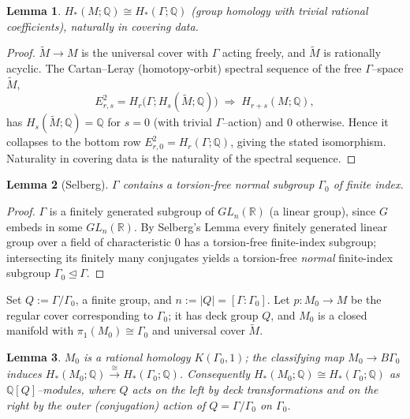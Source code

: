 \documentclass[12pt]{article}
\newcommand{\bR}{\mathbb{R}}
\newcommand{\bQ}{\mathbb{Q}}
\newtheorem{lemma}{Lemma}
\theoremstyle{definition}
\begin{document}
\begin{lemma}\label{lem:rationalKpi1}
$H_*(M;\bQ)\cong H_*(\Gamma;\bQ)$ \textup{(}group homology with trivial rational
coefficients\textup{)}, naturally in covering data.
\end{lemma}

\begin{proof}
$\widetilde M\to M$ is the universal cover with $\Gamma$ acting freely, and
$\widetilde M$ is rationally acyclic.  The Cartan--Leray (homotopy-orbit)
spectral sequence of the free $\Gamma$--space $\widetilde M$,
\[
   E^2_{r,s}=H_r\!\bigl(\Gamma;H_s(\widetilde M;\bQ)\bigr)
   \;\Longrightarrow\; H_{r+s}(M;\bQ),
\]
has $H_s(\widetilde M;\bQ)=\bQ$ for $s=0$ (with trivial $\Gamma$--action) and $0$
otherwise.  Hence it collapses to the bottom row
$E^2_{r,0}=H_r(\Gamma;\bQ)$, giving the stated isomorphism.  Naturality in
covering data is the naturality of the spectral sequence.
\end{proof}

\begin{lemma}[Selberg]\label{lem:selberg}
$\Gamma$ contains a torsion-free normal subgroup $\Gamma_0$ of finite index.
\end{lemma}

\begin{proof}
$\Gamma$ is a finitely generated subgroup of $GL_n(\bR)$ (a linear group), since
$G$ embeds in some $GL_n(\bR)$.  By Selberg's Lemma every finitely generated
linear group over a field of characteristic $0$ has a torsion-free finite-index
subgroup; intersecting its finitely many conjugates yields a torsion-free
\emph{normal} finite-index subgroup $\Gamma_0\trianglelefteq\Gamma$.
\end{proof}

Set $Q:=\Gamma/\Gamma_0$, a finite group, and $n:=|Q|=[\Gamma:\Gamma_0]$.  Let
$p\colon M_0\to M$ be the regular cover corresponding to $\Gamma_0$; it has deck
group $Q$, and $M_0$ is a closed manifold with $\pi_1(M_0)\cong\Gamma_0$ and
universal cover $\widetilde M$.

\begin{lemma}\label{lem:qhomology}
$M_0$ is a rational homology $K(\Gamma_0,1)$; the classifying map
$M_0\to B\Gamma_0$ induces $H_*(M_0;\bQ)\xrightarrow{\ \cong\ }H_*(\Gamma_0;\bQ)$.
Consequently $H_*(M_0;\bQ)\cong H_*(\Gamma_0;\bQ)$ as $\bQ[Q]$--modules, where $Q$
acts on the left by deck transformations and on the right by the outer
(conjugation) action of $Q=\Gamma/\Gamma_0$ on $\Gamma_0$.
\end{lemma}
\end{document}
